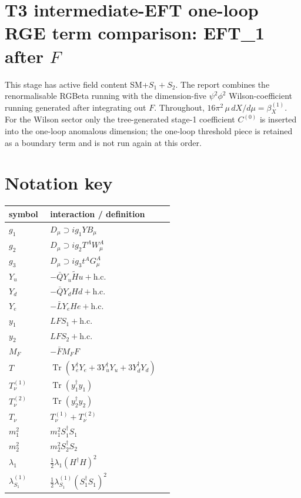 \documentclass[8pt]{article}
\begin{document}
\begin{landscape}
\section*{T3 intermediate-EFT one-loop RGE term comparison: EFT\_1 after $F$}
This stage has active field content SM+$S_1+S_2$. The report combines the renormalisable RGBeta running with the dimension-five $\psi^2\phi^2$ Wilson-coefficient running generated after integrating out $F$.
\medskip
Throughout, $16\pi^2\,\mu\,dX/d\mu=\beta_X^{(1)}$. For the Wilson sector only the tree-generated stage-1 coefficient $C^{(0)}$ is inserted into the one-loop anomalous dimension; the one-loop threshold piece is retained as a boundary term and is not run again at this order.
\section*{Notation key}
\begin{longtable}{@{}p{0.23\linewidth}p{0.69\linewidth}@{}}
\toprule
symbol & interaction / definition \\
\midrule
$g_1$ & $D_\mu\supset i g_1YB_\mu$ \\
$g_2$ & $D_\mu\supset i g_2T^AW_\mu^A$ \\
$g_3$ & $D_\mu\supset i g_3t^AG_\mu^A$ \\
$Y_u$ & $-\bar QY_u\widetilde Hu+\mathrm{h.c.}$ \\
$Y_d$ & $-\bar QY_dHd+\mathrm{h.c.}$ \\
$Y_e$ & $-\bar LY_eHe+\mathrm{h.c.}$ \\
$y_1$ & $LFS_1+\mathrm{h.c.}$ \\
$y_2$ & $LFS_2+\mathrm{h.c.}$ \\
$M_F$ & $-\bar FM_FF$ \\
$T$ & $\operatorname{Tr}(Y_e^\dagger Y_e+3Y_u^\dagger Y_u+3Y_d^\dagger Y_d)$ \\
$T_\nu^{(1)}$ & $\operatorname{Tr}(y_1^\dagger y_1)$ \\
$T_\nu^{(2)}$ & $\operatorname{Tr}(y_2^\dagger y_2)$ \\
$T_\nu$ & $T_\nu^{(1)}+T_\nu^{(2)}$ \\
$m_1^2$ & $m_1^2S_1^\dagger S_1$ \\
$m_2^2$ & $m_2^2S_2^\dagger S_2$ \\
$\lambda_1$ & $\frac12\lambda_1(H^\dagger H)^2$ \\
$\lambda_{S_1}^{(1)}$ & $\frac12\lambda_{S_1}^{(1)}(S_1^\dagger S_1)^2$ \\

\end{longtable}
\end{landscape}
\end{document}

